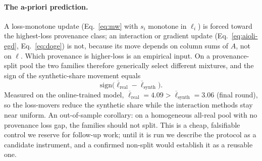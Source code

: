 \documentclass{article}
\begin{document}
\paragraph{The a-priori prediction.} A loss-monotone update (Eq.~\eqref{eq:mw} with $s_i$ monotone in $\ell_i$) is forced toward the highest-loss provenance class; an interaction or gradient update (Eq.~\eqref{eq:aioli-egd}, Eq.~\eqref{eq:doge}) is not, because its move depends on column sums of $A$, not on $\ell$. Which provenance is higher-loss is an empirical input. On a provenance-split pool the two families therefore generically select different mixtures, and the sign of the synthetic-share movement equals
\begin{equation}
\mathrm{sign}\!\big(\overline{\ell}_{\mathrm{real}} - \overline{\ell}_{\mathrm{synth}}\big).
\label{eq:sign}
\end{equation}
Measured on the online-trained model, $\overline{\ell}_{\mathrm{real}} = 4.09 > \overline{\ell}_{\mathrm{synth}} = 3.06$ (final round), so the loss-movers reduce the synthetic share while the interaction methods stay near uniform. An out-of-sample corollary: on a homogeneous all-real pool with no provenance loss gap, the families should not split. This is a cheap, falsifiable control we reserve for follow-up work; until it is run we describe the protocol as a candidate instrument, and a confirmed non-split would establish it as a reusable one.
\end{document}
